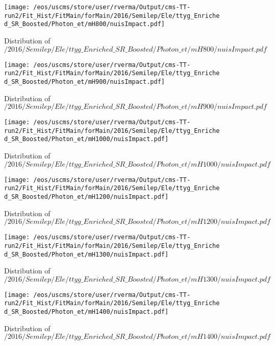 \begin{figure}
\centering
\texttt{[image: /eos/uscms/store/user/rverma/Output/cms-TT-run2/Fit\_Hist/FitMain/forMain/2016/Semilep/Ele/ttyg\_Enriched\_SR\_Boosted/Photon\_et/mH800/nuisImpact.pdf]}
\caption{Distribution of $/2016/Semilep/Ele/ttyg\_Enriched\_SR\_Boosted/Photon\_et/mH800/nuisImpact.pdf$}
\end{figure}

\begin{figure}
\centering
\texttt{[image: /eos/uscms/store/user/rverma/Output/cms-TT-run2/Fit\_Hist/FitMain/forMain/2016/Semilep/Ele/ttyg\_Enriched\_SR\_Boosted/Photon\_et/mH900/nuisImpact.pdf]}
\caption{Distribution of $/2016/Semilep/Ele/ttyg\_Enriched\_SR\_Boosted/Photon\_et/mH900/nuisImpact.pdf$}
\end{figure}

\begin{figure}
\centering
\texttt{[image: /eos/uscms/store/user/rverma/Output/cms-TT-run2/Fit\_Hist/FitMain/forMain/2016/Semilep/Ele/ttyg\_Enriched\_SR\_Boosted/Photon\_et/mH1000/nuisImpact.pdf]}
\caption{Distribution of $/2016/Semilep/Ele/ttyg\_Enriched\_SR\_Boosted/Photon\_et/mH1000/nuisImpact.pdf$}
\end{figure}

\begin{figure}
\centering
\texttt{[image: /eos/uscms/store/user/rverma/Output/cms-TT-run2/Fit\_Hist/FitMain/forMain/2016/Semilep/Ele/ttyg\_Enriched\_SR\_Boosted/Photon\_et/mH1200/nuisImpact.pdf]}
\caption{Distribution of $/2016/Semilep/Ele/ttyg\_Enriched\_SR\_Boosted/Photon\_et/mH1200/nuisImpact.pdf$}
\end{figure}

\begin{figure}
\centering
\texttt{[image: /eos/uscms/store/user/rverma/Output/cms-TT-run2/Fit\_Hist/FitMain/forMain/2016/Semilep/Ele/ttyg\_Enriched\_SR\_Boosted/Photon\_et/mH1300/nuisImpact.pdf]}
\caption{Distribution of $/2016/Semilep/Ele/ttyg\_Enriched\_SR\_Boosted/Photon\_et/mH1300/nuisImpact.pdf$}
\end{figure}

\begin{figure}
\centering
\texttt{[image: /eos/uscms/store/user/rverma/Output/cms-TT-run2/Fit\_Hist/FitMain/forMain/2016/Semilep/Ele/ttyg\_Enriched\_SR\_Boosted/Photon\_et/mH1400/nuisImpact.pdf]}
\caption{Distribution of $/2016/Semilep/Ele/ttyg\_Enriched\_SR\_Boosted/Photon\_et/mH1400/nuisImpact.pdf$}
\end{figure}

